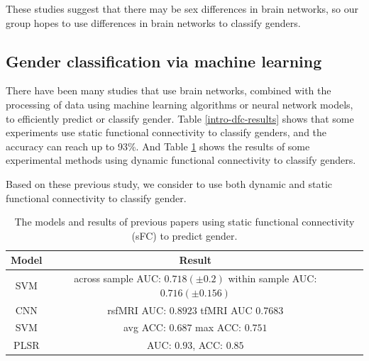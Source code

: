 \documentclass[11pt]{article}
\begin{document}
These studies suggest that there may be sex differences in brain networks, so our group hopes to use differences in brain networks to classify genders.

\subsection{Gender classification via machine learning}

There have been many studies that use brain networks, combined with the processing of data using machine learning algorithms or neural network models, to efficiently predict or classify gender. Table \ref{intro-dfc-results} shows that some experiments use static functional connectivity to classify genders, and the accuracy can reach up to 93\%. And Table \ref{intro-sfc-results} shows the results of some experimental methods using dynamic functional connectivity to classify genders.

Based on these previous study, we consider to use both dynamic and static functional connectivity to classify gender.

\begin{table}[H]
    \centering
    \begin{tabular}{|c|c|c|c|}
        \hline
        Model                     & Result                                         \\
        \hline
        SVM\cite{Al_Zoubi2020-ij} & \makecell{across sample AUC: $0.718 (\pm 0.2)$ \\  within sample AUC: $0.716 (\pm 0.156)$}       \\
        \hline
        CNN\cite{Leming2021-on}   & \makecell{rsfMRI AUC: $0.8923$                 \\ tfMRI AUC 0.7683}   \\
        \hline
        SVM\cite{Weis2020-cc}     & \makecell{avg ACC: $0.687$                     \\ max ACC: $0.751$} \\
        \hline
        PLSR\cite{Zhang2018-fi}   & AUC: $0.93$, ACC: $0.85$
        \\
        \hline
    \end{tabular}
    \caption{The models and results of previous papers using static functional connectivity (sFC) to predict gender.}
    \label{intro-sfc-results}
\end{table}
\end{document}
